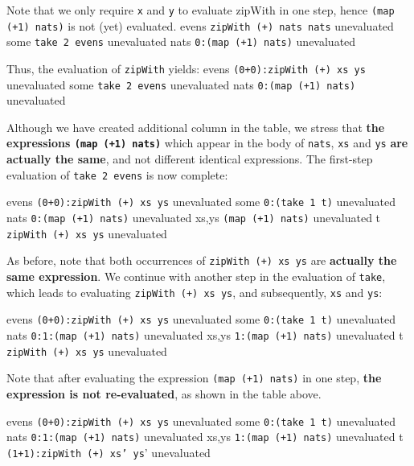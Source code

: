 Note that we only require \texttt{x} and \texttt{y} to evaluate zipWith in one step, hence \texttt{(map (+1) nats)} is not (yet) evaluated. 
\textbar evens \textbar \texttt{zipWith (+) nats nats} \textbar unevaluated \textbar
\textbar some \textbar \texttt{take 2 evens} \textbar unevaluated \textbar
\textbar nats \textbar \texttt{0:(map (+1) nats)} \textbar unevaluated \textbar


Thus, the evaluation of \texttt{zipWith} yields:
\textbar evens \textbar \texttt{(0+0):zipWith (+) xs ys} \textbar unevaluated \textbar
\textbar some \textbar \texttt{take 2 evens} \textbar unevaluated \textbar
\textbar nats \textbar \texttt{0:(map (+1) nats)} \textbar unevaluated \textbar

Although we have created additional column in the table, we stress that \textbf{the expressions \texttt{(map (+1) nats)}} which appear in the body of \texttt{nats}, \texttt{xs} and \texttt{ys} \textbf{are actually the same}, and not different identical expressions. The first-step evaluation of \texttt{take 2 evens} is now complete:

\textbar evens \textbar \texttt{(0+0):zipWith (+) xs ys} \textbar unevaluated \textbar
\textbar some \textbar \texttt{0:(take 1 t)} \textbar unevaluated \textbar
\textbar nats \textbar \texttt{0:(map (+1) nats)} \textbar unevaluated \textbar
\textbar xs,ys \textbar \texttt{(map (+1) nats)} \textbar unevaluated \textbar
\textbar t \textbar \texttt{zipWith (+) xs ys} \textbar unevaluated \textbar

As before, note that both occurrences of \texttt{zipWith (+) xs ys} are \textbf{actually the same expression}. We continue with another step in the evaluation of \texttt{take}, which leads to evaluating \texttt{zipWith (+) xs ys}, and subsequently, \texttt{xs} and \texttt{ys}:

\textbar evens \textbar \texttt{(0+0):zipWith (+) xs ys} \textbar unevaluated \textbar
\textbar some \textbar \texttt{0:(take 1 t)} \textbar unevaluated \textbar
\textbar nats \textbar \texttt{0:1:(map (+1) nats)} \textbar unevaluated \textbar
\textbar xs,ys \textbar \texttt{1:(map (+1) nats)} \textbar unevaluated \textbar
\textbar t \textbar \texttt{zipWith (+) xs ys} \textbar unevaluated \textbar

Note that after evaluating the expression \texttt{(map (+1) nats)} in one step, \textbf{the expression is not re-evaluated}, as shown in the table above.

\textbar evens \textbar \texttt{(0+0):zipWith (+) xs ys} \textbar unevaluated \textbar
\textbar some \textbar \texttt{0:(take 1 t)} \textbar unevaluated \textbar
\textbar nats \textbar \texttt{0:1:(map (+1) nats)} \textbar unevaluated \textbar
\textbar xs,ys \textbar \texttt{1:(map (+1) nats)} \textbar unevaluated \textbar
\textbar t \textbar \texttt{(1+1):zipWith (+) xs' ys}' \textbar unevaluated \textbar


